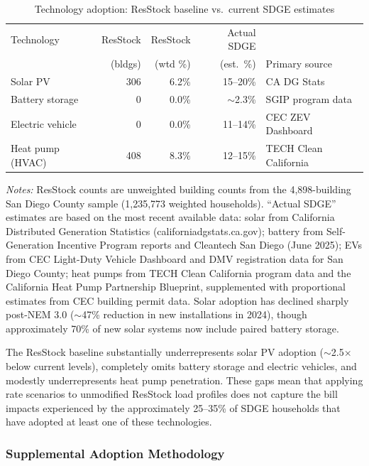 \begin{table}[htbp]
\centering
\caption{Technology adoption: ResStock baseline vs.\ current SDGE estimates}
\label{tab:tech_adoption_comparison}
\begin{tabular}{lrrrl}
\toprule
Technology & ResStock & ResStock & Actual SDGE & \\
           & (bldgs)  & (wtd \%) & (est.\ \%)  & Primary source \\
\midrule
Solar PV          & 306 & 6.2\%  & 15--20\% & CA DG Stats \\
Battery storage   &   0 & 0.0\%  & $\sim$2.3\% & SGIP program data \\
Electric vehicle  &   0 & 0.0\%  & 11--14\% & CEC ZEV Dashboard \\
Heat pump (HVAC)  & 408 & 8.3\%  & 12--15\% & TECH Clean California \\
\bottomrule
\end{tabular}
\begin{tablenotes}
\small
\item \textit{Notes:} ResStock counts are unweighted building counts from the 4,898-building San Diego County sample (1,235,773 weighted households). ``Actual SDGE'' estimates are based on the most recent available data: solar from California Distributed Generation Statistics (californiadgstats.ca.gov); battery from Self-Generation Incentive Program reports and Cleantech San Diego (June 2025); EVs from CEC Light-Duty Vehicle Dashboard and DMV registration data for San Diego County; heat pumps from TECH Clean California program data and the California Heat Pump Partnership Blueprint, supplemented with proportional estimates from CEC building permit data. Solar adoption has declined sharply post-NEM 3.0 ($\sim$47\% reduction in new installations in 2024), though approximately 70\% of new solar systems now include paired battery storage.
\end{tablenotes}
\end{table}

The ResStock baseline substantially underrepresents solar PV adoption ($\sim$2.5$\times$ below current levels), completely omits battery storage and electric vehicles, and modestly underrepresents heat pump penetration. These gaps mean that applying rate scenarios to unmodified ResStock load profiles does not capture the bill impacts experienced by the approximately 25--35\% of SDGE households that have adopted at least one of these technologies.

\subsubsection{Supplemental Adoption Methodology}
\label{sec:supplemental_adoption}

